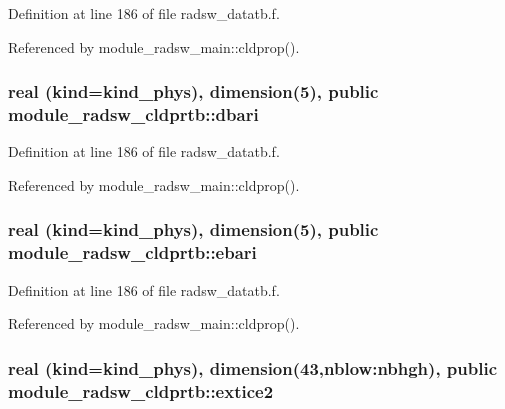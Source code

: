 Definition at line 186 of file radsw\+\_\+datatb.\+f.



Referenced by module\+\_\+radsw\+\_\+main\+::cldprop().

\subsubsection[{\texorpdfstring{dbari}{dbari}}]{\setlength{\rightskip}{0pt plus 5cm}real (kind=kind\+\_\+phys), dimension(5), public module\+\_\+radsw\+\_\+cldprtb\+::dbari}\hypertarget{namespacemodule__radsw__cldprtb_af8b02590603ea2f838d954cb0a93bbeb}{}\label{namespacemodule__radsw__cldprtb_af8b02590603ea2f838d954cb0a93bbeb}


Definition at line 186 of file radsw\+\_\+datatb.\+f.



Referenced by module\+\_\+radsw\+\_\+main\+::cldprop().

\subsubsection[{\texorpdfstring{ebari}{ebari}}]{\setlength{\rightskip}{0pt plus 5cm}real (kind=kind\+\_\+phys), dimension(5), public module\+\_\+radsw\+\_\+cldprtb\+::ebari}\hypertarget{namespacemodule__radsw__cldprtb_a3cc7ab844ca564bd3df02a687bbc2f43}{}\label{namespacemodule__radsw__cldprtb_a3cc7ab844ca564bd3df02a687bbc2f43}


Definition at line 186 of file radsw\+\_\+datatb.\+f.



Referenced by module\+\_\+radsw\+\_\+main\+::cldprop().

\subsubsection[{\texorpdfstring{extice2}{extice2}}]{\setlength{\rightskip}{0pt plus 5cm}real (kind=kind\+\_\+phys), dimension(43,nblow\+:nbhgh), public module\+\_\+radsw\+\_\+cldprtb\+::extice2}\hypertarget{namespacemodule__radsw__cldprtb_a8ed403302034ea073243157749673e14}{}\label{namespacemodule__radsw__cldprtb_a8ed403302034ea073243157749673e14}


